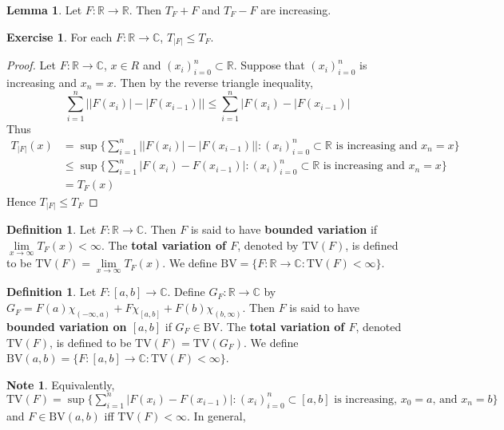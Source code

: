 \documentclass[12pt]{amsart}
\theoremstyle{definition}
\newtheorem{defn}[definition]{Definition}
\newtheorem{note}[definition]{Note}
\newtheorem{lem}[definition]{Lemma}
\newtheorem{ex}[definition]{Exercise}
\newcommand{\C}{\mathbb{C}}
\newcommand{\R}{\mathbb{R}}
\newcommand{\BV}{\text{BV}}
\newcommand{\TV}{\text{TV}}
\newcommand{\lex}[1]{\label{ex:#1}}
\newcommand{\ld}[1]{\label{defn:#1}}
\begin{document}
	\begin{lem}
		Let $F:\R \rightarrow \R$. Then $T_F+F$ and $T_F-F$ are increasing.
	\end{lem}
	
	\begin{ex} \lex{00000} 
		For each $F:\R \rightarrow \C$, $T_{|F|} \leq T_F$.
	\end{ex}
	
	\begin{proof}
		Let $F:\R \rightarrow \C$, $x \in R$ and $(x_i)_{i=0}^n \subset \R$. Suppose that $(x_i)_{i=0}^n$ is increasing and $x_n=x$. Then by the reverse triangle inequality, $$ \sum_{i=1}^n\big||F(x_i)|-|F(x_{i-1})|\big|
		\leq \sum_{i=1}^n\big|F(x_i)-|F(x_{i-1})\big|$$
		Thus 
		\begin{align*}
			T_{|F|}(x) 
			&= \sup\bigg \{\sum_{i=1}^{n}\big||F(x_{i})| - |F(x_{i-1})|\big|: (x_i)_{i=0}^n \subset \R \text{ is increasing and } x_n=x  \bigg \} \\
			& \leq \sup\bigg \{\sum_{i=1}^{n}|F(x_{i}) - F(x_{i-1})|: (x_i)_{i=0}^n \subset \R \text{ is increasing and } x_n=x  \bigg \} \\
			&= T_F(x)
		\end{align*}
		Hence $T_{|F|} \leq T_F$
	\end{proof}
	
	\begin{defn} \ld{00000} 
		Let $F:\R \rightarrow \C$. Then $F$ is said to have \textbf{bounded variation} if $\lim \limits_{x \rightarrow \infty}T_F(x)<\infty$. The \textbf{total variation of $F$}, denoted by $\TV(F)$, is defined to be $\TV(F) = \lim\limits_{x\rightarrow \infty}T_F(x)$.
		We define $\BV = \{F:\R \rightarrow \C: \TV(F)<\infty \}$.
	\end{defn}
	
	\begin{defn} \ld{00000} 
		Let $F:[a,b] \rightarrow \C$. Define $G_F:\R \rightarrow \C$ by $G_F = F(a)\chi_{(-\infty,a)} + F\chi_{[a,b]}+F(b)\chi_{(b,\infty)}$. Then $F$ is said to have \textbf{bounded variation on $[a,b]$} if $G_F \in \BV$. The \textbf{total variation of $F$}, denoted $\TV(F)$, is defined to be $\TV(F) = \TV(G_F)$. We define $\BV(a,b) = \{F:[a,b] \rightarrow \C: \TV(F) < \infty\}$.
	\end{defn}
	
	\begin{note}
		Equivalently, $\TV(F) = \sup \big \{\sum_{i=1}^{n}|F(x_{i}) - F(x_{i-1})|: (x_i)_{i=0}^n \subset [a,b] \text{ is increasing, } x_0=a \text{, and } x_n=b\big \}$ and $F \in \BV(a,b)$ iff $\TV(F) < \infty$. In general, 
	\end{note}
	
\end{document}

